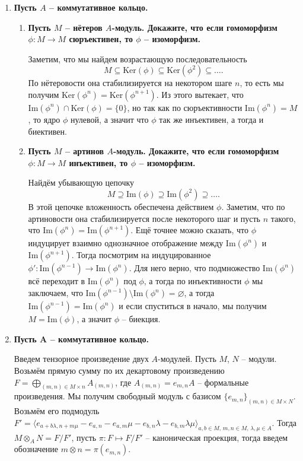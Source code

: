 \documentclass{article}
\begin{document}
\begin{enumerate}
    \item \textbf{Пусть $A$ – коммутативное кольцо.}
        \begin{enumerate}
            \item \textbf{Пусть $M$ – нётеров $A$-модуль. Докажите, что если гомоморфизм $\phi:M\rightarrow M$ сюръективен,
                то $\phi$ – изоморфизм.}

                Заметим, что мы найдем возрастающую последовательность
                \[M\subseteq\text{Ker}(\phi)\subseteq\text{Ker}(\phi^2)\subseteq\ldots.\]
                По нётеровости она стабилизируется на некотором шаге $n$, то есть мы получим $\text{Ker}(\phi^n)=\text{Ker}
                (\phi^{n+1})$. Из этого вытекает, что $\text{Im}(\phi^n)\cap\text{Ker}(\phi)=\{0\}$, но так как по сюръективности
                $\text{Im}(\phi^n)=M$, то ядро $\phi$ нулевой, а значит что $\phi$ так же инъективен, а тогда и биективен.

            \item \textbf{Пусть $M$ – артинов $A$-модуль. Докажите, что если гомоморфизм $\phi: M\rightarrow M$ инъективен,
                то $\phi$ – изоморфизм.}

                Найдём убывающую цепочку
                \[M\supseteq\text{Im}(\phi)\supseteq\text{Im}(\phi^2)\supseteq\ldots.\]
                В этой цепочке вложенность обеспечена действием $\phi$. Заметим, что
                по артиновости она стабилизируется после некоторого шаг и пусть $n$ такого, что $\text{Im}(\phi^n)=\text{Im}(\phi^{n+1})$.
                Ещё точнее можно сказать, что $\phi$ индуцирует взаимно однозначное отображение между $\text{Im}(\phi^n)$ и
                $\text{Im}(\phi^{n+1})$. Тогда посмотрим на индуцированное $\phi': \text{Im}(\phi^{n-1})\rightarrow\text{Im}(\phi^n)$.
                Для него верно, что подмножество $\text{Im}(\phi^n)$ всё переходит в $\text{Im}(\phi^n)$ под $\phi$, а тогда по
                инъективности $\phi$ мы заключаем, что $\text{Im}(\phi^{n-1})\setminus\text{Im}(\phi^n)=\varnothing$, а тогда
                $\text{Im}(\phi^{n-1})=\text{Im}(\phi^n)$ и если спуститься в начало, мы получим $M=\text{Im}(\phi)$, а значит $\phi$ –
                биекция.
        \end{enumerate}

    \item \textbf{Пусть A – коммутативное кольцо.}

        Введем тензорное произведение двух $A$-модулей. Пусть $M$, $N$ – модули. Возьмём прямую сумму по их декартовому
        произведению $F=\bigoplus_{(m,n)\in M\times n} A_{(m,n)}$, где $A_{(m,n)}=e_{m,n}A$ – формальные произведения.
        Мы получим свободный модуль с базисом $\{e_{m,n}\}_{(m,n)\in M\times N}$. Возьмём его подмодуль $F'=\langle
        e_{a+b\lambda,n+m\mu}-e_{a,n}-e_{a,m}\mu-e_{b,n}\lambda-e_{b,m}\lambda\mu\rangle_{a,b\in M,\,m,n\in M,\,\lambda,\mu\in A}$.
        Тогда $M\otimes_A N=F/F'$, пусть $\pi:F\mapsto F/F'$ – каноническая проекция, тогда введем обозначение
        $m\otimes n = \pi(e_{m,n})$.



\end{enumerate}
\end{document}
